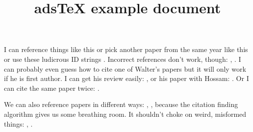 \documentclass[10pt,a4paper]{article}
\begin{document}
\title{adsTeX example document}
\maketitle
I can reference things like this \cite{THands2014MNRAS} or pick another paper from the same year like this \cite{THands2014IAUS} or use these ludicrous ID strings \citep{2014MNRAS.445.2285D}. Incorrect references don't work, though: \cite{MBlobbyNEdmonds1990}, \cite{3123MNRAS.123.123D}. I can probably even guess how to cite one of Walter's papers \citep{WDehnen2000MNRAS} but it will only work if he is first author. I can get his review easily: \cite{DehnenRead2011}, or his paper with Hossam: \cite{DehnenHAly2012}. Or I can cite the same paper twice: \cite{THands2014MNRAS}.

We can also reference papers in different ways: \cite{rein2009A&A}, \cite{Swift2013ApJ}, because the citation finding algorithm gives us some breathing room. It shouldn't choke on weird, misformed things: \cite{MBlahMNRAS}, \cite{2012MNRAS}.

\end{document}
